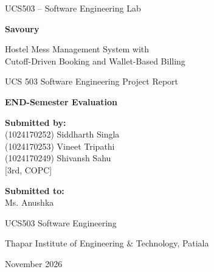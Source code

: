 \documentclass[11pt,a4paper]{article}
\begin{document}
\begin{titlepage}
\thispagestyle{empty}
\centering
{\large UCS503 -- Software Engineering Lab\par}
\vspace{3.2cm}
{\fontsize{30}{36}\selectfont\bfseries Savoury\par}
\vspace{0.8cm}
{\Large Hostel Mess Management System with\\[0.3em]
Cutoff-Driven Booking and Wallet-Based Billing\par}
\vspace{1.8cm}
{\large UCS 503 Software Engineering Project Report\par}
\vspace{0.6cm}
{\large\bfseries END-Semester Evaluation\par}
\vspace{2.6cm}

\begin{minipage}[t]{0.55\textwidth}
\raggedright
\textbf{Submitted by:}\\[0.5em]
(1024170252) Siddharth Singla\\
(1024170253) Vineet Tripathi\\
(1024170249) Shivansh Sahu\\[1em]
[3rd, COPC]
\end{minipage}\hfill
\begin{minipage}[t]{0.38\textwidth}
\raggedleft
\textbf{Submitted to:}\\[0.5em]
Ms. Anushka
\end{minipage}

\vfill
{\large UCS503 Software Engineering\par}
\vspace{0.4em}
{\large Thapar Institute of Engineering \& Technology, Patiala\par}
\vspace{0.4em}
{\large November 2026\par}
\end{titlepage}

\renewcommand{\contentsname}{\centering TABLE OF CONTENTS}
\tableofcontents
\clearpage
\listoffigures
\listoftables
\clearpage
{}
\end{document}
